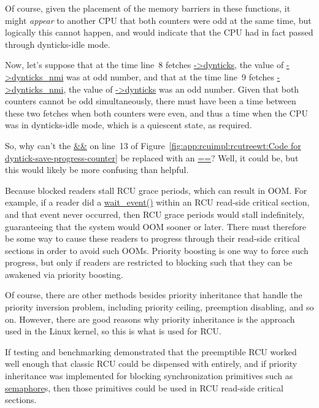 	Of course, given the placement of the memory barriers in these
	functions, it might \emph{appear} to another CPU that both
	counters were odd at the same time, but logically this cannot
	happen, and would indicate that the CPU had in fact passed
	through dynticks-idle mode.

	Now, let's suppose that at the time line~8 fetches \url{->dynticks},
	the value of \url{->dynticks_nmi} was at odd number, and that at the
	time line~9 fetches \url{->dynticks_nmi}, the value of
	\url{->dynticks} was an odd number.
	Given that both counters cannot be odd simultaneously, there must
	have been a time between these two fetches when both counters
	were even, and thus a time when the CPU was in dynticks-idle
	mode, which is a quiescent state, as required.

	So, why can't the \url{&&} on line~13 of
	Figure~\ref{fig:app:rcuimpl:rcutreewt:Code for dyntick-save-progress-counter}
	be replaced with an \url{==}?
	Well, it could be, but this would likely be more confusing
	than helpful.


	Because blocked readers stall RCU grace periods,
	which can result in OOM.
	For example, if a reader did a \url{wait_event()} within
	an RCU read-side critical section, and that event never occurred,
	then RCU grace periods would stall indefinitely, guaranteeing that
	the system would OOM sooner or later.
	There must therefore be some way to cause these readers to progress
	through their read-side critical sections in order to avoid such OOMs.
	Priority boosting is one way to force such progress, but only if
	readers are restricted to blocking such that they can be awakened via
	priority boosting.

	Of course, there are other methods besides priority inheritance
	that handle the priority inversion problem, including priority ceiling,
	preemption disabling, and so on.
	However, there are good reasons why priority inheritance is the approach
	used in the Linux kernel, so this is what is used for RCU.


	If testing and benchmarking demonstrated that the
	preemptible RCU worked well enough that classic RCU could be dispensed
	with entirely, and if priority inheritance was implemented for blocking
	synchronization primitives
	such as \url{semaphore}s, then those primitives could be
	used in RCU read-side critical sections.

